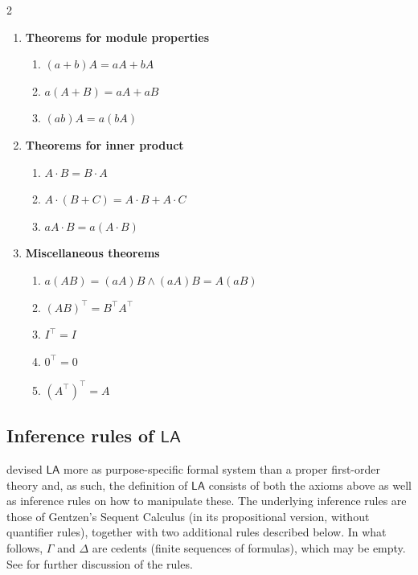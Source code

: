 \documentclass[11pt]{article}
\newcommand{\LA}{\mathsf{LA}}
\theoremstyle{definition}
\theoremstyle{plain}
\theoremstyle{remark}
\begin{document}
\begin{multicols}{2}
\begin{enumerate}
\begin{enumerate}
        \item $A(B+C)=AB+CA$ 
        \item $(B+C)A=BA+CA$  
        \item $\Sigma 0 =0_{\text{field}}$
        \item $\Sigma(cA)=c\Sigma(A)$
        \item $\Sigma(A+B)=\Sigma(A)+\Sigma(B)$
        \item $\Sigma(A)=\Sigma(A^\intercal)$
    \end{enumerate}
    \item \textbf{Theorems for module properties}
    \begin{enumerate}
        \item $(a+b)A=aA+bA$ 
        \item $a(A+B)=aA+aB$ 
        \item $(ab)A=a(bA)$
    \end{enumerate}
    \item \textbf{Theorems for inner product}
    \begin{enumerate}
        \item $A\cdot B= B\cdot A$ 
        \item $A\cdot (B+C)=A\cdot B+ A\cdot C$ 
        \item $aA\cdot B=a(A\cdot B)$
    \end{enumerate}
    \item \textbf{Miscellaneous theorems}
    \begin{enumerate}
        \item $a(AB)=(aA)B\wedge (aA)B=A(aB)$
        \item $(AB)^\intercal=B^\intercal A^\intercal$
        \item $I^\intercal=I$
        \item $0^\intercal=0$
        \item $(A^\intercal)^\intercal=A$ 
    \end{enumerate}
\end{enumerate}
\end{multicols}

\subsection{Inference rules of $\LA$}
\label{app:inf-rules}
\citeauthor{cooksoltys} devised $\LA$ more as purpose-specific formal system than a proper first-order theory and, as such, the definition of $\LA$ consists of both the axioms above as well as inference rules on how to manipulate these. The underlying inference rules are those of Gentzen's Sequent Calculus (in its propositional version, without quantifier rules), together with two additional rules described below. In what follows, $\Gamma$ and $\Delta$ are cedents (finite sequences of formulas), which may be empty. See \autocite[Section 2.2]{cooksoltys} for further discussion of the rules.
\end{document}
